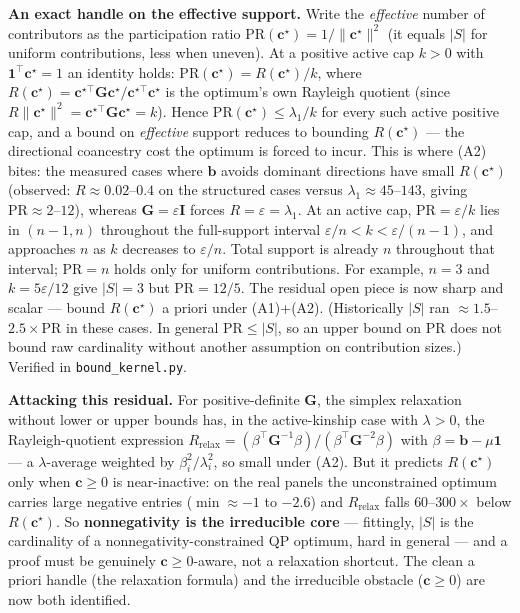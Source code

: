 \documentclass[11pt]{article}
\theoremstyle{plain}
\newcommand{\tp}{^{\top}}
\newcommand{\bc}{\mathbf{c}}
\newcommand{\bb}{\mathbf{b}}
\newcommand{\bG}{\mathbf{G}}
\newcommand{\bone}{\mathbf{1}}
\begin{document}
\textbf{An exact handle on the effective support.} Write the \emph{effective} number of contributors
as the participation ratio $\mathrm{PR}(\bc^\star) = 1/\lVert\bc^\star\rVert^2$ (it equals $|S|$ for
uniform contributions, less when uneven). At a positive active cap $k>0$ with $\bone\tp\bc^\star = 1$ an identity
holds: $\mathrm{PR}(\bc^\star) = R(\bc^\star)/k$, where
$R(\bc^\star) = \bc^{\star\top}\bG\bc^\star / \bc^{\star\top}\bc^\star$ is the optimum's own Rayleigh
quotient (since $R\lVert\bc^\star\rVert^2 = \bc^{\star\top}\bG\bc^\star = k$). Hence
$\mathrm{PR}(\bc^\star) \le \lambda_1/k$ for every such active positive cap, and a bound on \emph{effective} support reduces to bounding $R(\bc^\star)$ --- the directional coancestry cost the optimum is forced to incur. This is
where (A2) bites: the measured cases where $\bb$ avoids dominant directions have small $R(\bc^\star)$ (observed: $R \approx 0.02$--$0.4$ on the structured cases versus
$\lambda_1 \approx 45$--$143$, giving $\mathrm{PR} \approx 2$--$12$), whereas $\bG = \varepsilon\mathbf{I}$
forces $R = \varepsilon = \lambda_1$. At an active cap, $\mathrm{PR}=\varepsilon/k$ lies in
$(n-1,n)$ throughout the full-support interval $\varepsilon/n<k<\varepsilon/(n-1)$,
and approaches $n$ as $k$ decreases to $\varepsilon/n$. Total support is already $n$
throughout that interval; $\mathrm{PR}=n$ holds only for uniform contributions.
For example, $n=3$ and $k=5\varepsilon/12$ give $|S|=3$ but $\mathrm{PR}=12/5$.
The residual open piece is now sharp and
scalar --- bound $R(\bc^\star)$ a priori under (A1)+(A2). (Historically $|S|$ ran $\approx1.5$--$2.5\times\mathrm{PR}$ in these cases. In general $\mathrm{PR}\le|S|$, so an upper bound on PR does not bound raw cardinality without another assumption on contribution sizes.) Verified
in \texttt{bound\_kernel.py}.

\textbf{Attacking this residual.} For positive-definite $\bG$, the simplex relaxation without lower or upper bounds has, in the active-kinship case with $\lambda>0$, the Rayleigh-quotient expression
$R_{\mathrm{relax}} = (\beta\tp\bG^{-1}\beta)/(\beta\tp\bG^{-2}\beta)$ with $\beta = \bb - \mu\bone$ ---
a $\lambda$-average weighted by $\beta_i^2/\lambda_i^2$, so small under (A2). But it predicts
$R(\bc^\star)$ only when $\bc \ge 0$ is near-inactive: on the real panels the unconstrained optimum
carries large negative entries ($\min \approx -1$ to $-2.6$) and $R_{\mathrm{relax}}$ falls
$60$--$300\times$ below $R(\bc^\star)$. So \textbf{nonnegativity is the irreducible core} --- fittingly,
$|S|$ is the cardinality of a nonnegativity-constrained QP optimum, hard in general --- and a proof
must be genuinely $\bc \ge 0$-aware, not a relaxation shortcut. The clean a priori handle (the
relaxation formula) and the irreducible obstacle ($\bc \ge 0$) are now both identified.
\end{document}
